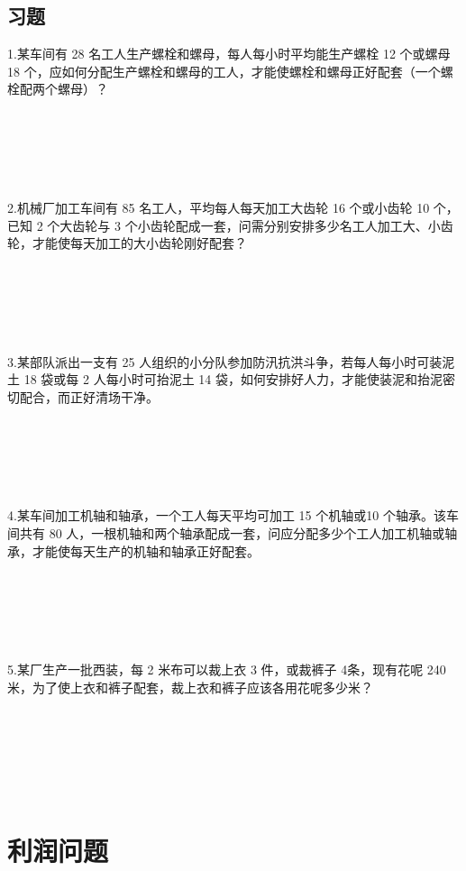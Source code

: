 \documentclass{article}
\begin{document}
\subsection{习题}
1.某车间有 28 名工人生产螺栓和螺母，每人每小时平均能生产螺栓 12 个或螺母 18 个，应如何分配生产螺栓和螺母的工人，才能使螺栓和螺母正好配套（一个螺栓配两个螺母）？

~\\
~\\
~\\
~\\
~\\
2.机械厂加工车间有 85 名工人，平均每人每天加工大齿轮 16 个或小齿轮 10 个，已知 2 个大齿轮与 3 个小齿轮配成一套，问需分别安排多少名工人加工大、小齿轮，才能使每天加工的大小齿轮刚好配套？

~\\
~\\
~\\
~\\
~\\
3.某部队派出一支有 25 人组织的小分队参加防汛抗洪斗争，若每人每小时可装泥土 18 袋或每 2 人每小时可抬泥土 14 袋，如何安排好人力，才能使装泥和抬泥密切配合，而正好清场干净。

~\\
~\\
~\\
~\\
~\\
4.某车间加工机轴和轴承，一个工人每天平均可加工 15 个机轴或10 个轴承。该车间共有 80 人，一根机轴和两个轴承配成一套，问应分配多少个工人加工机轴或轴承，才能使每天生产的机轴和轴承正好配套。

~\\
~\\
~\\
~\\
~\\
5.某厂生产一批西装，每 2 米布可以裁上衣 3 件，或裁裤子 4条，现有花呢 240 米，为了使上衣和裤子配套，裁上衣和裤子应该各用花呢多少米？

~\\
~\\
~\\
~\\
~\\

\newpage
\section{利润问题}
\end{document}
